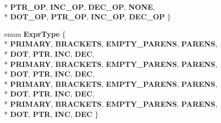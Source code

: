 \begin{DoxyCompactItemize}
\\*
{\bfseries P\-T\-R\-\_\-\-O\-P}, 
{\bfseries I\-N\-C\-\_\-\-O\-P}, 
{\bfseries D\-E\-C\-\_\-\-O\-P}, 
{\bfseries N\-O\-N\-E}, 
\\*
{\bfseries D\-O\-T\-\_\-\-O\-P}, 
{\bfseries P\-T\-R\-\_\-\-O\-P}, 
{\bfseries I\-N\-C\-\_\-\-O\-P}, 
{\bfseries D\-E\-C\-\_\-\-O\-P}
 \}
\item 
enum {\bfseries Expr\-Type} \{ \\*
{\bfseries P\-R\-I\-M\-A\-R\-Y}, 
{\bfseries B\-R\-A\-C\-K\-E\-T\-S}, 
{\bfseries E\-M\-P\-T\-Y\-\_\-\-P\-A\-R\-E\-N\-S}, 
{\bfseries P\-A\-R\-E\-N\-S}, 
\\*
{\bfseries D\-O\-T}, 
{\bfseries P\-T\-R}, 
{\bfseries I\-N\-C}, 
{\bfseries D\-E\-C}, 
\\*
{\bfseries P\-R\-I\-M\-A\-R\-Y}, 
{\bfseries B\-R\-A\-C\-K\-E\-T\-S}, 
{\bfseries E\-M\-P\-T\-Y\-\_\-\-P\-A\-R\-E\-N\-S}, 
{\bfseries P\-A\-R\-E\-N\-S}, 
\\*
{\bfseries D\-O\-T}, 
{\bfseries P\-T\-R}, 
{\bfseries I\-N\-C}, 
{\bfseries D\-E\-C}, 
\\*
{\bfseries P\-R\-I\-M\-A\-R\-Y}, 
{\bfseries B\-R\-A\-C\-K\-E\-T\-S}, 
{\bfseries E\-M\-P\-T\-Y\-\_\-\-P\-A\-R\-E\-N\-S}, 
{\bfseries P\-A\-R\-E\-N\-S}, 
\\*
{\bfseries D\-O\-T}, 
{\bfseries P\-T\-R}, 
{\bfseries I\-N\-C}, 
{\bfseries D\-E\-C}, 
\\*
{\bfseries P\-R\-I\-M\-A\-R\-Y}, 
{\bfseries B\-R\-A\-C\-K\-E\-T\-S}, 
{\bfseries E\-M\-P\-T\-Y\-\_\-\-P\-A\-R\-E\-N\-S}, 
{\bfseries P\-A\-R\-E\-N\-S}, 
\\*
{\bfseries D\-O\-T}, 
{\bfseries P\-T\-R}, 
{\bfseries I\-N\-C}, 
{\bfseries D\-E\-C}
 \}
\end{DoxyCompactItemize}
